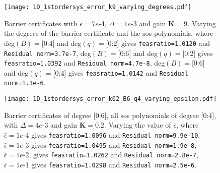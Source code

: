 

\begin{figure}[H]
	\centering
	\texttt{[image: 1D\_1stordersys\_error\_k9\_varying\_degrees.pdf]}
	\caption{Barrier certificates with $\bar{\epsilon}=7e$-4, $\Delta=1e$-3 and gain $\textbf{K}=9$. Varying the degrees of the barrier certificate and the \gls{sos} polynomials, where deg$(B)=$[0:4] and deg$(q)=$[0:2] gives  \texttt{feasratio=1.0120} and \texttt{Residual norm=3.7e-7}, deg$(B)=$[0:6] and deg$(q)=$[0:2] gives  \texttt{feasratio=1.0392} and \texttt{Residual norm=4.7e-8}, deg$(B)=$[0:6] and deg$(q)=$[0:4] gives \texttt{feasratio=1.0142} and \texttt{Residual norm=1.1e-6}.}
	\label{fig:1D_1stordersys_error_k9_varying_degrees}
\end{figure}

\begin{figure}[H]
	\centering
	\texttt{[image: 1D\_1stordersys\_error\_k02\_B6\_q4\_varying\_epsilon.pdf]}
	\caption{Barrier certificates of degree [0:6], all \gls{sos} polynomials of degree [0:4], with  $\Delta=4e$-3 and gain $\textbf{K}=0.2$. Varying the value of $\bar{\epsilon}$, where $\bar{\epsilon}=1e$-4 gives \texttt{feasratio=1.0096} and \texttt{Residual norm=9.9e-10}, $\bar{\epsilon}=1e$-3 gives \texttt{feasratio=1.0495} and \texttt{Residual norm=1.9e-8}, $\bar{\epsilon}=1e$-2, gives \texttt{feasratio=1.0262} and \texttt{Residual norm=2.8e-7}, $\bar{\epsilon}=1e$-1 gives \texttt{feasratio=1.0298} and \texttt{Residual norm=2.5e-6}.}
	\label{fig:1D_1stordersys_error_k02_B6_q4_varying_epsilon}
\end{figure}